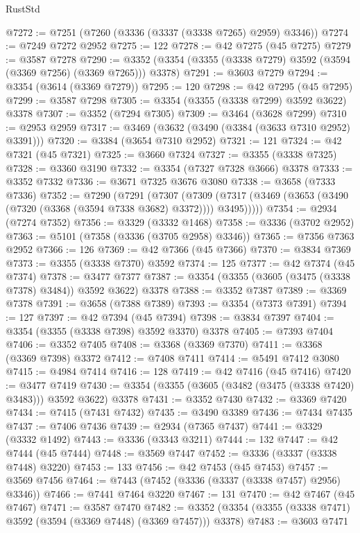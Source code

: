 \begin{lexlean}{RustStd}
\begin{coremodule}
@7272 := @7251 (@7260 (@3336 (@3337 (@3338 @7265) @2959) @3346))
@7274 := @7249 @7272 @2952
@7275 := 122
@7278 := @42 @7275 (@45 @7275)
@7279 := @3587 @7278
@7290 := @3352 (@3354 (@3355 (@3338 @7279) @3592 (@3594 (@3369 @7256) (@3369 @7265))) @3378)
@7291 := @3603 @7279
@7294 := @3354 (@3614 (@3369 @7279))
@7295 := 120
@7298 := @42 @7295 (@45 @7295)
@7299 := @3587 @7298
@7305 := @3354 (@3355 (@3338 @7299) @3592 @3622) @3378
@7307 := @3352 (@7294 @7305)
@7309 := @3464 (@3628 @7299)
@7310 := @2953 @2959
@7317 := @3469 (@3632 (@3490 (@3384 (@3633 @7310 @2952) @3391)))
@7320 := @3384 (@3654 @7310 @2952)
@7321 := 121
@7324 := @42 @7321 (@45 @7321)
@7325 := @3660 @7324
@7327 := @3355 (@3338 @7325)
@7328 := @3360 @3190
@7332 := @3354 (@7327 @7328 @3666) @3378
@7333 := @3352 @7332
@7336 := @3671 @7325 @3676 @3080
@7338 := @3658 (@7333 @7336)
@7352 := @7290
    (@7291
      (@7307
        (@7309 (@7317 (@3469 (@3653 (@3490 (@7320 (@3368 (@3594 @7338 @3682) @3372)))) @3495)))))
@7354 := @2934 (@7274 @7352)
@7356 := @3329 (@3332 @1468)
@7358 := @3336 (@3702 @2952)
@7363 := @5101 (@7358 (@3336 (@3705 @2958) @3346))
@7365 := @7356 @7363 @2952
@7366 := 126
@7369 := @42 @7366 (@45 @7366)
@7370 := @3834 @7369
@7373 := @3355 (@3338 @7370) @3592
@7374 := 125
@7377 := @42 @7374 (@45 @7374)
@7378 := @3477 @7377
@7387 := @3354 (@3355 (@3605 (@3475 (@3338 @7378) @3484)) @3592 @3622) @3378
@7388 := @3352 @7387
@7389 := @3369 @7378
@7391 := @3658 (@7388 @7389)
@7393 := @3354 (@7373 @7391)
@7394 := 127
@7397 := @42 @7394 (@45 @7394)
@7398 := @3834 @7397
@7404 := @3354 (@3355 (@3338 @7398) @3592 @3370) @3378
@7405 := @7393 @7404
@7406 := @3352 @7405
@7408 := @3368 (@3369 @7370)
@7411 := @3368 (@3369 @7398) @3372
@7412 := @7408 @7411
@7414 := @5491 @7412 @3080
@7415 := @4984 @7414
@7416 := 128
@7419 := @42 @7416 (@45 @7416)
@7420 := @3477 @7419
@7430 := @3354 (@3355 (@3605 (@3482 (@3475 (@3338 @7420) @3483))) @3592 @3622) @3378
@7431 := @3352 @7430
@7432 := @3369 @7420
@7434 := @7415 (@7431 @7432)
@7435 := @3490 @3389
@7436 := @7434 @7435
@7437 := @7406 @7436
@7439 := @2934 (@7365 @7437)
@7441 := @3329 (@3332 @1492)
@7443 := @3336 (@3343 @3211)
@7444 := 132
@7447 := @42 @7444 (@45 @7444)
@7448 := @3569 @7447
@7452 := @3336 (@3337 (@3338 @7448) @3220)
@7453 := 133
@7456 := @42 @7453 (@45 @7453)
@7457 := @3569 @7456
@7464 := @7443 (@7452 (@3336 (@3337 (@3338 @7457) @2956) @3346))
@7466 := @7441 @7464 @3220
@7467 := 131
@7470 := @42 @7467 (@45 @7467)
@7471 := @3587 @7470
@7482 := @3352 (@3354 (@3355 (@3338 @7471) @3592 (@3594 (@3369 @7448) (@3369 @7457))) @3378)
@7483 := @3603 @7471

\end{coremodule}
\end{lexlean}
